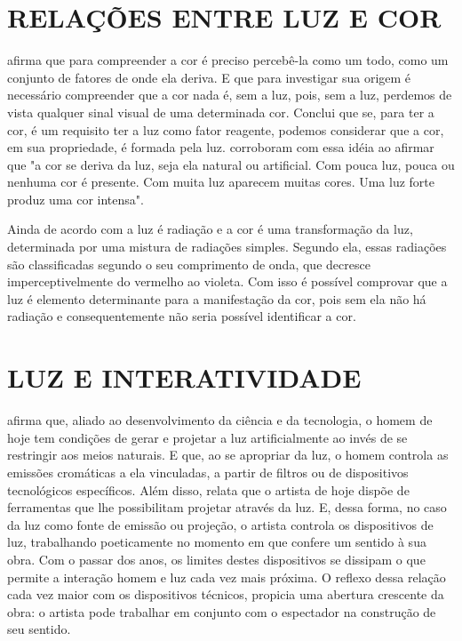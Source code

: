 \section{RELAÇÕES ENTRE LUZ E COR}

 afirma que para compreender a cor é preciso percebê-la como um todo, como um conjunto de fatores de onde ela deriva. E que para investigar sua origem é necessário compreender que a cor nada é, sem a luz, pois, sem a luz, perdemos de vista qualquer sinal visual de uma determinada cor. Conclui que se, para ter a cor, é um requisito ter a luz como fator reagente, podemos considerar que a cor, em sua propriedade, é formada pela luz.  corroboram com essa idéia ao afirmar que "a cor se deriva da luz, seja ela natural ou artificial. Com pouca luz, pouca ou nenhuma cor é presente. Com muita luz aparecem muitas cores. Uma luz forte produz uma cor intensa". 

Ainda de acordo com  a luz é radiação e a cor é uma transformação da luz, determinada por uma mistura de radiações simples. Segundo ela, essas radiações são classificadas segundo o seu comprimento de onda, que decresce imperceptivelmente do vermelho ao violeta. Com isso é possível comprovar que a luz é elemento determinante para a manifestação da cor, pois sem ela não há radiação e consequentemente não seria possível identificar a cor.

\section{LUZ E INTERATIVIDADE}

 afirma que, aliado ao desenvolvimento da ciência e da tecnologia, o homem de hoje tem condições de gerar e projetar a luz artificialmente ao invés de se restringir aos meios naturais. E que, ao se apropriar da luz, o homem controla as emissões cromáticas a ela vinculadas, a partir de filtros ou de dispositivos tecnológicos específicos. Além disso, relata que o artista de hoje dispõe de ferramentas que lhe possibilitam projetar através da luz. E, dessa forma, no caso da luz como fonte de emissão ou projeção, o artista controla os dispositivos de luz, trabalhando poeticamente no momento em que confere um sentido à sua obra. Com o passar dos anos, os limites destes dispositivos se dissipam o que permite a interação homem e luz cada vez mais próxima. O reflexo dessa relação cada vez maior com os dispositivos técnicos, propicia uma abertura crescente da obra: o artista pode trabalhar em conjunto com o espectador na construção de seu sentido.


